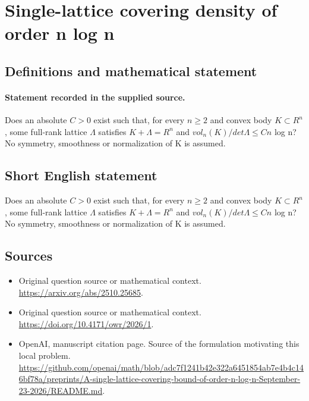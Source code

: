 \documentclass[11pt]{article}
\begin{document}
\section*{Single-lattice covering density of order n log n}\label{statement}
\subsection{Definitions and mathematical statement}
\paragraph{Statement recorded in the supplied source.}
Does an absolute $C>0$ exist such that, for every $n\geq 2$ and convex body $K\subset R^{n}$, some full-rank lattice $\Lambda $ satisfies $K+\Lambda =R^{n}$ and $vol_n(K)/det\Lambda \leq Cn$ log n? No symmetry, smoothness or normalization of K is assumed.
\subsection{Short English statement}
Does an absolute $C>0$ exist such that, for every $n\geq 2$ and convex body $K\subset R^{n}$, some full-rank lattice $\Lambda $ satisfies $K+\Lambda =R^{n}$ and $vol_n(K)/det\Lambda \leq Cn$ log n? No symmetry, smoothness or normalization of K is assumed.
\subsection{Sources}
\begin{itemize}
\item[S1] Original question source or mathematical context.
\url{https://arxiv.org/abs/2510.25685}.
\item[S2] Original question source or mathematical context.
\url{https://doi.org/10.4171/owr/2026/1}.
\item[S3] OpenAI, manuscript citation page. Source of the formulation motivating this local problem.
\url{https://github.com/openai/math/blob/adc7f1241b42e322a6451854ab7e4b4c146bf78a/preprints/A-single-lattice-covering-bound-of-order-n-log-n-September-23-2026/README.md}.
\end{itemize}
\end{document}
